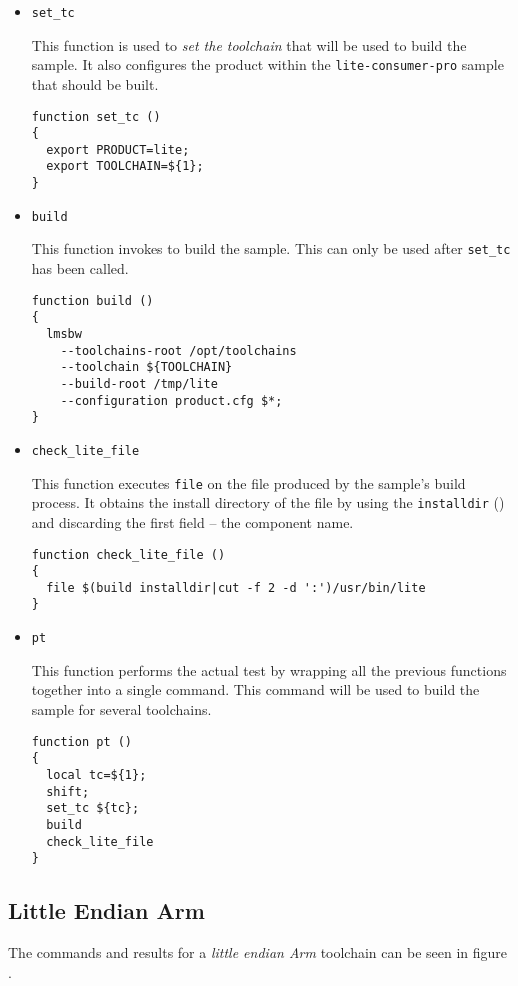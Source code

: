 \begin{itemize}
  \item{\texttt{set\_tc}}

    This function is used to \emph{set the toolchain} that will be
    used to build the sample.  It also configures the product within
    the \texttt{lite-consumer-pro} sample that should be built.

\begin{verbatim}
function set_tc ()
{
  export PRODUCT=lite;
  export TOOLCHAIN=${1};
}
\end{verbatim}

\item{\texttt{build}}

  This function invokes \lmsbw to build the sample.  This can only be
  used after \texttt{set\_tc} has been called.

\begin{verbatim}
function build ()
{
  lmsbw
    --toolchains-root /opt/toolchains
    --toolchain ${TOOLCHAIN}
    --build-root /tmp/lite
    --configuration product.cfg $*;
}
\end{verbatim}

\item{\texttt{check\_lite\_file}}

  This function executes \texttt{file} on the file produced by the
  sample's build process.  It obtains the install directory of the
  file by using the \texttt{installdir} ()
  and discarding the first field -- the component name.

\begin{small}
\begin{verbatim}
function check_lite_file ()
{
  file $(build installdir|cut -f 2 -d ':')/usr/bin/lite
}
\end{verbatim}
\end{small}

\item{\texttt{pt}}

  This function performs the actual test by wrapping all the previous
  functions together into a single command.  This command will be used
  to build the sample for several toolchains.

\begin{verbatim}
function pt ()
{
  local tc=${1};
  shift;
  set_tc ${tc};
  build
  check_lite_file
}
\end{verbatim}
\end{itemize}

\subsection{Little Endian Arm}
The commands and results for a \emph{little endian Arm} toolchain can be
seen in figure .

